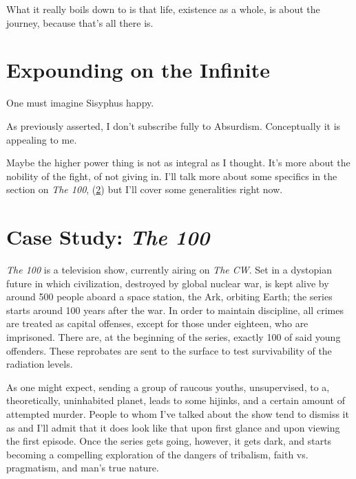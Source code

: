 \documentclass[../butidigress.tex]{subfiles}
\begin{document}
What it really boils down to is that life, existence as a whole, is about the journey, because that's all there is.\autocite{mythofsisyphus}

\section{Expounding on the Infinite}\label{sec:voidexpounding}
\epigraph{One must imagine Sisyphus happy.}{}
As previously asserted, I don't subscribe fully to Absurdism.
Conceptually it is appealing to me.

Maybe the higher power thing is not as integral as I thought.
It's more about the nobility of the fight, of not giving in.
I'll talk more about some specifics in the section on \textit{The 100}, (\ref{sec:thehundred}) but I'll cover some generalities right now.


\section{Case Study: \textit{The 100}}\label{sec:thehundred}
\textit{The 100} is a television show, currently airing on \textit{The CW}.
Set in a dystopian future in which civilization, destroyed by global nuclear war, is kept alive by around 500 people aboard a space station, the Ark, orbiting Earth; the series starts around 100 years after the war.
In order to maintain discipline, all crimes are treated as capital offenses, except for those under eighteen, who are imprisoned.
There are, at the beginning of the series, exactly 100 of said young offenders.
These reprobates are sent to the surface to test survivability of the radiation levels.

As one might expect, sending a group of raucous youths, unsupervised, to a, theoretically, uninhabited planet, leads to some hijinks, and a certain amount of attempted murder.
People to whom I've talked about the show tend to dismiss it as  and I'll admit that it does look like that upon first glance and upon viewing the first episode.
Once the series gets going, however, it gets dark, and starts becoming a compelling exploration of the dangers of tribalism, faith vs. pragmatism, and man's true nature.
\end{document}
